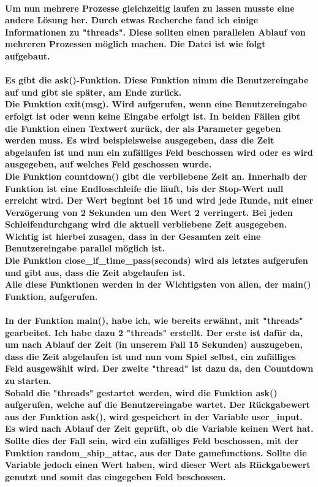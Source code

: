 \documentclass{article}
\begin{document}
\paragraph{Um nun mehrere Prozesse gleichzeitig laufen zu lassen musste eine andere Lösung her. Durch etwas Recherche fand ich einige Informationen zu "threads". Diese sollten einen parallelen Ablauf von mehreren Prozessen möglich machen. Die Datei ist wie folgt aufgebaut.\\\\Es gibt die ask()-Funktion. Diese Funktion nimm die Benutzereingabe auf und gibt sie später, am Ende zurück.\\Die Funktion exit(msg). Wird aufgerufen, wenn eine Benutzereingabe erfolgt ist oder wenn keine Eingabe erfolgt ist. In beiden Fällen gibt die Funktion einen Textwert zurück, der als Parameter gegeben werden muss. Es wird beispielsweise ausgegeben, dass die Zeit abgelaufen ist und nun ein zufälliges Feld beschossen wird oder es wird ausgegeben, auf welches Feld geschossen wurde.\\Die Funktion countdown() gibt die verbliebene Zeit an. Innerhalb der Funktion ist eine Endlosschleife die läuft, bis der Stop-Wert null erreicht wird. Der Wert beginnt bei 15 und wird  jede Runde, mit einer  Verzögerung von 2 Sekunden um den Wert 2 verringert. Bei jeden Schleifendurchgang wird die aktuell verbliebene Zeit ausgegeben. Wichtig  ist hierbei zusagen, dass in der Gesamten zeit eine Benutzereingabe parallel möglich ist.\\Die Funktion close\_if\_time\_pass(seconds) wird als letztes aufgerufen und gibt aus, dass die Zeit abgelaufen ist.\\Alle diese Funktionen werden in der Wichtigsten von allen, der main() Funktion, aufgerufen.\\\\In der Funktion main(), habe ich, wie bereits erwähnt, mit "threads"\\gearbeitet. Ich habe dazu 2 "threads" erstellt. Der erste ist dafür da, um nach Ablauf der Zeit (in unserem Fall 15 Sekunden) auszugeben, dass die Zeit abgelaufen ist und nun vom Spiel selbst, ein zufälliges Feld ausgewählt wird. Der zweite "thread" ist dazu da, den Countdown zu starten.\\Sobald die "threads" gestartet werden, wird die Funktion ask() aufgerufen, welche auf die Benutzereingabe wartet. Der Rückgabewert aus der Funktion ask(), wird gespeichert in der Variable user\_input. Es wird nach Ablauf der Zeit geprüft, ob die Variable keinen Wert hat. Sollte dies der Fall sein, wird ein zufälliges Feld beschossen, mit der Funktion random\_ship\_attac, aus der Date gamefunctions. Sollte die Variable jedoch einen Wert haben, wird dieser Wert als Rückgabewert genutzt und somit das eingegeben Feld beschossen.  } 
\end{document}
